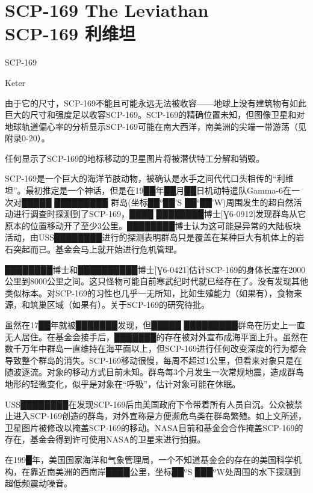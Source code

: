\chapter[SCP-169 利维坦]{
    SCP-169 The Leviathan\\
    SCP-169 利维坦
}

\label{chap:SCP-169}

SCP-169

Keter

由于它的尺寸，SCP-169不能且可能永远无法被收容——地球上没有建筑物有如此巨大的尺寸和强度足以收容SCP-169。SCP-169的精确位置未知，但图像卫星和对地球轨道偏心率的分析显示SCP-169可能在南大西洋，南美洲的尖端一带游荡（见附录0-20）。

任何显示了SCP-169的地标移动的卫星图片将被潜伏特工分解和销毁。

SCP-169是一个巨大的海洋节肢动物，被确认是水手之间代代口头相传的“利维坦”。最初推定是一个神话，但是在19██年██月██日机动特遣队Gamma-6在一次对█████ █████████ 群岛(坐标██°██'S ██°██'W)周围发生的超自然活动进行调查时探测到了SCP-169，████ ████████博士{[}Ɣ6-0912]发现群岛从它原本的位置移动开了至少3公里。████████博士认为这可能是异常的大陆板块活动，由USS████████进行的探测表明群岛只是覆盖在某种巨大有机体上的岩石突起而已。基金会马上就开始进行危机管理。

████████博士和██████████博士{[}Ɣ6-0421]估计SCP-169的身体长度在2000公里到8000公里之间。这只怪物可能自前寒武纪时代就已经存在了。没有发现其他类似标本。对SCP-169的习性也几乎一无所知，比如生殖能力（如果有），食物来源，和筑巢区域（如果有）。关于SCP-169的研究待批。

虽然在17██年就被███████发现，但█████ █████████群岛在历史上一直无人居住。在基金会接手后，███████的存在被对外宣布成海平面上升。虽然在数千万年中群岛一直维持在海平面以上，但SCP-169进行任何改变深度的行为都会导致整个群岛的消失。SCP-169移动很慢，每周不超过1公里，但看来对象只是在随波逐流。对象的移动方式目前未知。群岛每3个月发生一次常规地震，造成群岛地形的轻微变化，似乎是对象在“呼吸”，估计对象可能在休眠。

USS████████在发现SCP-169后由美国政府下令带着所有人员自沉。公众被禁止进入SCP-169创造的群岛，对外宣称是方便濒危鸟类在群岛繁殖。如上文所述，卫星图片被修改以掩盖SCP-169的移动。NASA目前和基金会合作掩盖SCP-169的存在，基金会得到许可使用NASA的卫星来进行拍摄。

在199█年，美国国家海洋和气象管理局，一个不知道基金会的存在的美国科学机构，在靠近南美洲的西南岸████公里，坐标██ºS ███ºW处周围的水下探测到超低频震动噪音。

